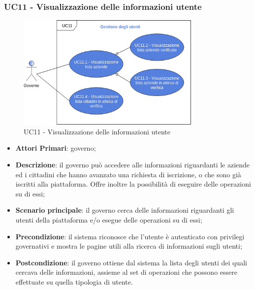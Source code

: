  \subsubsection{UC11 - Visualizzazione delle informazioni utente}
 \begin{figure}[h]
 	\includegraphics[width=9cm]{res/images/UC11.png}
 	\centering
 	\caption{UC11 - Visualizzazione delle informazioni utente}
 	
 \end{figure}
 \begin{itemize}
 	\item \textbf{Attori Primari}: governo;
 	\item \textbf{Descrizione}: il governo può accedere alle informazioni riguardanti le aziende ed i cittadini che hanno avanzato una richiesta di iscrizione, o che sono già iscritti alla piattaforma. Offre inoltre la possibilità di eseguire delle operazioni su di essi;
 	\item \textbf{Scenario principale}: il governo cerca delle informazioni riguardanti gli utenti della piattaforma e/o esegue delle operazioni su di essi;
 	
 	\item \textbf{Precondizione}: il sistema riconosce che l'utente è autenticato con privilegi governativi e mostra le pagine utili alla ricerca di informazioni sugli utenti;
 	
 	\item \textbf{Postcondizione}: il governo ottiene dal sistema la lista degli utenti dei quali cercava delle informazioni, assieme al set di operazioni che possono essere effettuate su quella tipologia di utente.
 \end{itemize}
